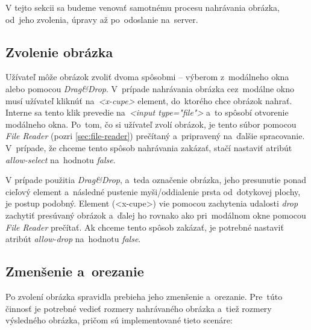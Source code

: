 V tejto sekcii sa budeme venovať samotnému procesu nahrávania obrázka, od~jeho zvolenia, úpravy až po~odoslanie na~server.

\subsection{Zvolenie obrázka}

Užívateľ môže obrázok zvoliť dvoma spôsobmi -- výberom z~modálneho okna alebo pomocou \emph{Drag\&Drop}. V~prípade nahrávania obrázka cez~modálne okno musí užívateľ kliknúť na~\emph{<x-cupe>} element, do~ktorého chce obrázok nahrať. Interne sa tento klik prevedie na~\emph{<input type="file"\textgreater} a~to spôsobí otvorenie modálneho okna. Po~tom, čo si užívateľ zvolí obrázok, je tento súbor pomocou \emph{File Reader} (pozri \ref{sec:file-reader}) prečítaný a~pripravený na~ďalšie spracovanie. V~prípade, že chceme tento spôsob nahrávania zakázať, stačí nastaviť atribút \emph{allow-select} na~hodnotu \emph{false}.

V prípade použitia \emph{Drag\&Drop}, a~teda označenie obrázka, jeho presunutie ponad cieľový element a~následné pustenie myši/oddialenie prsta od~dotykovej plochy, je postup podobný. Element (<x-cupe>) vie pomocou zachytenia udalosti \emph{drop} zachytiť presúvaný obrázok a~ďalej ho rovnako ako pri~modálnom okne pomocou \emph{File Reader} prečítať. Ak chceme tento spôsob zakázať, je potrebné nastaviť atribút \emph{allow-drop} na~hodnotu \emph{false}.

\subsection{Zmenšenie a~orezanie}

Po zvolení obrázka spravidla prebieha jeho zmenšenie a~orezanie. Pre~túto činnosť je potrebné vedieť rozmery nahrávaného obrázka a~tiež rozmery výsledného obrázka, pričom sú implementované tieto scenáre:

